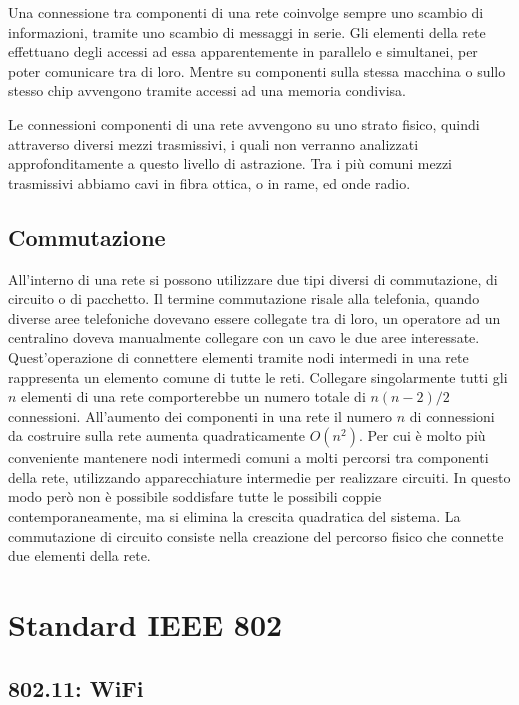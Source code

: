 \documentclass{article}
\numberwithin{equation}{subsection}
\begin{document}
Una connessione tra componenti di una rete coinvolge sempre uno scambio di informazioni, tramite uno scambio di messaggi in serie. Gli elementi della 
rete effettuano degli accessi ad essa apparentemente in parallelo e simultanei, per poter comunicare tra di loro. Mentre su componenti sulla stessa macchina o sullo 
stesso chip avvengono tramite accessi ad una memoria condivisa. 

Le connessioni componenti di una rete avvengono su uno strato fisico, quindi attraverso diversi mezzi trasmissivi, i quali non verranno analizzati approfonditamente a 
questo livello di astrazione. Tra i più comuni mezzi trasmissivi abbiamo cavi in fibra ottica, o in rame, ed onde radio. 

\subsection{Commutazione}

All'interno di una rete si possono utilizzare due tipi diversi di commutazione, di circuito o di pacchetto. Il termine commutazione risale alla telefonia, quando 
diverse aree telefoniche dovevano essere collegate tra di loro, un operatore ad un centralino doveva manualmente collegare con un cavo le due aree interessate. 
Quest'operazione di connettere elementi tramite nodi intermedi in una rete rappresenta un elemento comune di tutte le reti. Collegare singolarmente tutti gli 
$n$ elementi di una rete comporterebbe un numero totale di $n(n-2)/2$ connessioni. All'aumento dei componenti in una rete il numero $n$ di connessioni da costruire sulla 
rete aumenta quadraticamente $O(n^2)$. Per cui è molto più conveniente mantenere nodi intermedi comuni a molti percorsi tra componenti della rete, utilizzando 
apparecchiature intermedie per realizzare circuiti. In questo modo però non è possibile soddisfare tutte le possibili coppie contemporaneamente, ma si elimina la 
crescita quadratica del sistema. 
La commutazione di circuito consiste nella creazione del percorso fisico che connette due elementi della rete. 



\section{Standard IEEE 802}


\subsection{802.11: WiFi}
\end{document}

